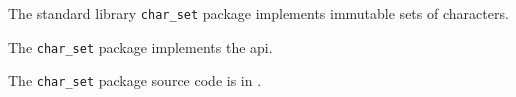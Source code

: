 
The standard library {\tt char\_set} package implements immutable sets of characters.

The {\tt char\_set} package implements the  api.

The {\tt char\_set} package source code is in .

